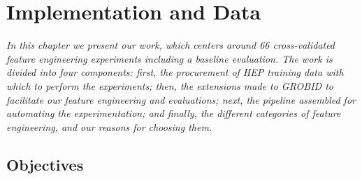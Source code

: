 
\chapter{Implementation and Data} %

\label{Chapter4} %


\emph{In this chapter we present our work, which centers around 66 cross-validated feature engineering experiments including a baseline evaluation. The work is divided into four components: first, the procurement of HEP training data with which to perform the experiments; then, the extensions made to GROBID to facilitate our feature engineering and evaluations; next, the pipeline assembled for automating the experimentation; and finally, the different categories of feature engineering, and our reasons for choosing them.}

\section{Objectives}

